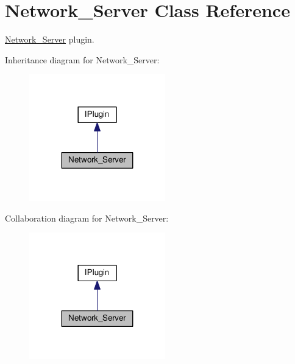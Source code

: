 \hypertarget{class_network___server}{}\section{Network\+\_\+\+Server Class Reference}
\label{class_network___server}


\hyperlink{class_network___server}{Network\+\_\+\+Server} plugin.  




Inheritance diagram for Network\+\_\+\+Server\+:\nopagebreak
\begin{figure}[H]
\begin{center}
\leavevmode
\includegraphics[width=167pt]{class_network___server__inherit__graph}
\end{center}
\end{figure}


Collaboration diagram for Network\+\_\+\+Server\+:\nopagebreak
\begin{figure}[H]
\begin{center}
\leavevmode
\includegraphics[width=167pt]{class_network___server__coll__graph}
\end{center}
\end{figure}
